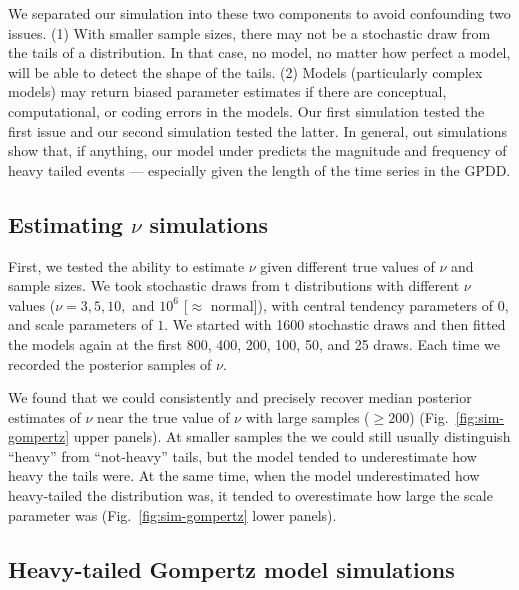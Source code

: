 We separated our simulation into these two components to avoid confounding two issues. (1) With smaller sample sizes, there may not be a stochastic draw from the tails of a distribution. In that case, no model, no matter how perfect a model, will be able to detect the shape of the tails. (2) Models (particularly complex models) may return biased parameter estimates if there are conceptual, computational, or coding errors in the models. Our first simulation tested the first issue and our second simulation tested the latter. In general, out simulations show that, if anything, our model under predicts the magnitude and frequency of heavy tailed events --- especially given the length of the time series in the GPDD.

\subsection{Estimating $\nu$ simulations}

First, we tested the ability to estimate $\nu$ given different true values of $\nu$ and sample sizes. We took stochastic draws from t distributions with different $\nu$ values ($\nu = 3, 5, 10,$ and $10^6$ [$\approx$ normal]), with central tendency parameters of $0$, and scale parameters of $1$. We started with 1600 stochastic draws and then fitted the models again at the first 800, 400, 200, 100, 50, and 25 draws. Each time we recorded the posterior samples of $\nu$.

We found that we could consistently and precisely recover median posterior estimates of $\nu$ near the true value of $\nu$ with large samples ($\ge 200$) (Fig.~\ref{fig:sim-gompertz} upper panels). At smaller samples the we could still usually distinguish ``heavy'' from ``not-heavy'' tails, but the model tended to underestimate how heavy the tails were. At the same time, when the model underestimated how heavy-tailed the distribution was, it tended to overestimate how large the scale parameter was (Fig.~\ref{fig:sim-gompertz} lower panels).



\subsection{Heavy-tailed Gompertz model simulations}


